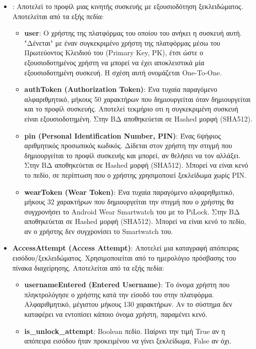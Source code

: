 	\begin{itemize}
		\item \textbf{}: Αποτελεί το προφίλ μιας κινητής συσκευής με εξουσιοδότηση ξεκλειδώματος. Αποτελείται από τα εξής πεδία:
		\begin{itemize}
			\item \textbf{user}: Ο χρήστης της πλατφόρμας του οποίου του ανήκει η συσκευή αυτή. "Δένεται" με έναν συγκεκριμένο χρήστη της πλατφόρμας μέσω του Πρωτεύοντος Κλειδιού του (Primary Key, PK), έτσι ώστε ο εξουσιοδοτημένος χρήστη να μπορεί να έχει αποκλειστικά μία εξουσιοδοτημένη συσκευή. Η σχέση αυτή ονομάζεται One-To-One.
			\item \textbf{authToken (Authorization Token)}: Ένα τυχαία παραγόμενο αλφαριθμητικό, μήκους 50 χαρακτήρων που δημιουργείται όταν δημιουργείται και το προφίλ συσκευής. Αποτελεί τεκμήριο οτι η συγκεκριμένη συσκευή είναι εξουσιοδοτημένη. Στην ΒΔ αποθηκεύεται σε Hashed μορφή (SHA512). 
			\item \textbf{pin (Personal Identification Number, PIN)}: Ένας 6ψήφιος αριθμητικός προσωπικός κωδικός. Δίδεται στον χρήστη την στιγμή που δημιουργείται το προφίλ συσκευής και μπορεί, αν θελήσει να τον αλλάξει. Στην ΒΔ αποθηκεύεται σε Hashed μορφή (SHA512). Μπορεί να είναι κενό το πεδίο, σε περίπτωση που ο χρήστης χρησιμοποιεί ξεκλείδωμα χωρίς PIN.
			\item \textbf{wearToken (Wear Token)}: Ένα τυχαία παραγόμενο αλφαρηθμιτικό, μήκους 32 χαρακτήρων που δημιουργείται την στιγμή που ο χρήστης θα συγχρονήσει το Android Wear Smartwatch του με το PiLock. Στην ΒΔ αποθηκεύεται σε Hashed μορφή (SHA512). Μπορεί να είναι κενό το πεδίο, αν ο χρήστης δεν συγχρονίσει το Smartwatch του.
		\end{itemize}
		\item \textbf{AccessAttempt (Access Attempt)}: Αποτελεί μια καταγραφή απόπειρας εισόδου/ξεκλειδώματος. Χρησιμοποιείται από το ημερολόγιο πρόσβασης του πίνακα διαχείρησης. Αποτελείται από τα εξής πεδία:
		\begin{itemize}
			\item \textbf{usernameEntered (Entered Username)}: Το όνομα χρήστη που πληκτρολόγησε ο χρήστης κατά την είσοδό του στην πλατφόρμα. Αλφαριθμητικό, μέγιστου μήκους 130 χαρακτήρων. Αν το σύστημα δεν καταφέρει να εντοπίσει κάποιο όνομα χρήστη, παραμένει κενό.
			\item \textbf{is\_unlock\_attempt}: Boolean πεδίο. Παίρνει την τιμή True αν η απόπειρα εισόδου ήταν προκειμένου να γίνει ξεκλείδωμα, False αν όχι.

\end{itemize}
\end{itemize}
